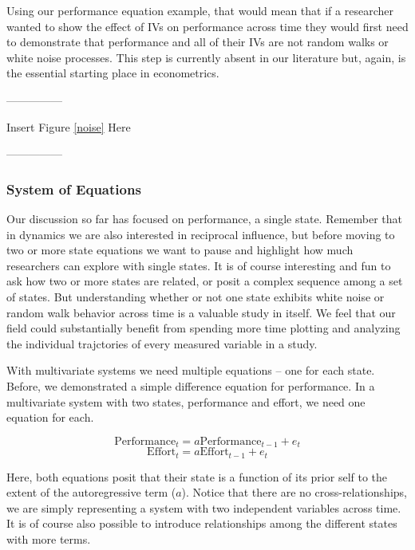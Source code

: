 \documentclass[english,,man]{apa6}
\theoremstyle{definition}
\theoremstyle{definition}
\theoremstyle{definition}
\theoremstyle{remark}
\begin{document}
Using our performance equation example, that would mean that if a
researcher wanted to show the effect of IVs on performance across time
they would first need to demonstrate that performance and all of their
IVs are not random walks or white noise processes. This step is
currently absent in our literature but, again, is the essential starting
place in econometrics.

\begin{center}

---------------

Insert Figure \ref{noise} Here

---------------

\end{center}

\hypertarget{system-of-equations}{%
\subsubsection{System of Equations}\label{system-of-equations}}

Our discussion so far has focused on performance, a single state.
Remember that in dynamics we are also interested in reciprocal
influence, but before moving to two or more state equations we want to
pause and highlight how much researchers can explore with single states.
It is of course interesting and fun to ask how two or more states are
related, or posit a complex sequence among a set of states. But
understanding whether or not one state exhibits white noise or random
walk behavior across time is a valuable study in itself. We feel that
our field could substantially benefit from spending more time plotting
and analyzing the individual trajctories of every measured variable in a
study.

With multivariate systems we need multiple equations -- one for each
state. Before, we demonstrated a simple difference equation for
performance. In a multivariate system with two states, performance and
effort, we need one equation for each.

\begin{equation}
\label{sysy}
\textrm{Performance}_{t} = a \textrm{Performance}_{t - 1} + e_{t}
\end{equation} \begin{equation}
\label{sysx}
\textrm{Effort}_{t} = a \textrm{Effort}_{t - 1} + e_{t}
\end{equation}

\noindent Here, both equations posit that their state is a function of
its prior self to the extent of the autoregressive term (\(a\)). Notice
that there are no cross-relationships, we are simply representing a
system with two independent variables across time. It is of course also
possible to introduce relationships among the different states with more
terms.
\end{document}

